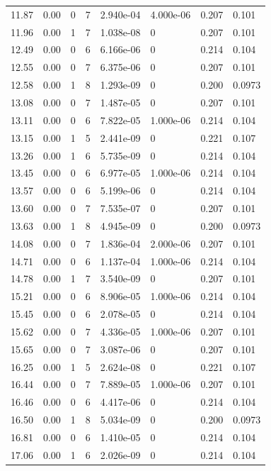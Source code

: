 \documentclass[preview]{standalone}
\begin{document}
{{{\begin{tabular}{L{1.2cm}C{1.2cm} C{0.3cm}C{0.5cm} C{1.4cm}C{1.4cm} C{1.4cm}C{1.4cm}}
  11.87  &  0.00  & 0     &  7 &  2.940e-04  & 4.000e-06  & 0.207 &  0.101   \\ 
  11.96  &  0.00  & 1     &  7 &  1.038e-08  & 0  & 0.207 &  0.101   \\ 
  12.49  &  0.00  & 0     &  6 &  6.166e-06  & 0  & 0.214 &  0.104   \\ 
  12.55  &  0.00  & 0     &  7 &  6.375e-06  & 0  & 0.207 &  0.101   \\ 
  12.58  &  0.00  & 1     &  8 &  1.293e-09  & 0  & 0.200 &  0.0973   \\ 
  13.08  &  0.00  & 0     &  7 &  1.487e-05  & 0  & 0.207 &  0.101   \\ 
  13.11  &  0.00  & 0     &  6 &  7.822e-05  & 1.000e-06  & 0.214 &  0.104   \\ 
  13.15  &  0.00  & 1     &  5 &  2.441e-09  & 0  & 0.221 &  0.107   \\ 
  13.26  &  0.00  & 1     &  6 &  5.735e-09  & 0  & 0.214 &  0.104   \\ 
  13.45  &  0.00  & 0     &  6 &  6.977e-05  & 1.000e-06  & 0.214 &  0.104   \\ 
  13.57  &  0.00  & 0     &  6 &  5.199e-06  & 0  & 0.214 &  0.104   \\ 
  13.60  &  0.00  & 0     &  7 &  7.535e-07  & 0  & 0.207 &  0.101   \\ 
  13.63  &  0.00  & 1     &  8 &  4.945e-09  & 0  & 0.200 &  0.0973   \\ 
  14.08  &  0.00  & 0     &  7 &  1.836e-04  & 2.000e-06  & 0.207 &  0.101   \\ 
  14.71  &  0.00  & 0     &  6 &  1.137e-04  & 1.000e-06  & 0.214 &  0.104   \\ 
  14.78  &  0.00  & 1     &  7 &  3.540e-09  & 0  & 0.207 &  0.101   \\ 
  15.21  &  0.00  & 0     &  6 &  8.906e-05  & 1.000e-06  & 0.214 &  0.104   \\ 
  15.45  &  0.00  & 0     &  6 &  2.078e-05  & 0  & 0.214 &  0.104   \\ 
  15.62  &  0.00  & 0     &  7 &  4.336e-05  & 1.000e-06  & 0.207 &  0.101   \\ 
  15.65  &  0.00  & 0     &  7 &  3.087e-06  & 0  & 0.207 &  0.101   \\ 
  16.25  &  0.00  & 1     &  5 &  2.624e-08  & 0  & 0.221 &  0.107   \\ 
  16.44  &  0.00  & 0     &  7 &  7.889e-05  & 1.000e-06  & 0.207 &  0.101   \\ 
  16.46  &  0.00  & 0     &  6 &  4.417e-06  & 0  & 0.214 &  0.104   \\ 
  16.50  &  0.00  & 1     &  8 &  5.034e-09  & 0  & 0.200 &  0.0973   \\ 
  16.81  &  0.00  & 0     &  6 &  1.410e-05  & 0  & 0.214 &  0.104   \\ 
  17.06  &  0.00  & 1     &  6 &  2.026e-09  & 0  & 0.214 &  0.104   \\ 
\hline 
\end{tabular} 

}}}
\end{document}
